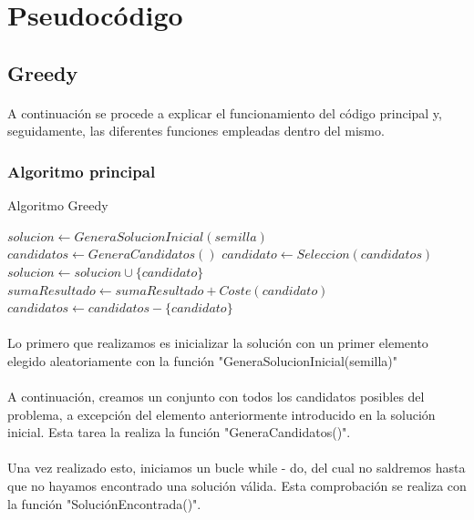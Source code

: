 \documentclass{article}
\begin{document}
	\section{Pseudocódigo}
	
	\subsection{Greedy}
	
		\paragraph{}A continuación se procede a explicar el funcionamiento del código principal y, seguidamente, las diferentes funciones empleadas dentro del mismo.
	
	\subsubsection{Algoritmo principal}
		\begin{algorithm}[H]
			\caption{Algoritmo Greedy}
			\begin{algorithmic}
				\STATE $solucion \leftarrow GeneraSolucionInicial(semilla)$
				\STATE $candidatos \leftarrow GeneraCandidatos()$
				\STATE $candidato \leftarrow Seleccion(candidatos)$
				\STATE $solucion \leftarrow solucion \cup \{candidato\}$
				\STATE $sumaResultado \leftarrow sumaResultado + Coste(candidato)$
				\ENDIF
				\STATE $candidatos \leftarrow candidatos - \{ candidato \}$
				\ENDWHILE
			\end{algorithmic}
		\end{algorithm}
	
		\paragraph{}Lo primero que realizamos es inicializar la solución con un primer elemento elegido aleatoriamente con la función "GeneraSolucionInicial(semilla)"
		
		\paragraph{}A continuación, creamos un conjunto con todos los candidatos posibles del problema, a excepción del elemento anteriormente introducido en la solución inicial. Esta tarea la realiza la función "GeneraCandidatos()".
		
		\paragraph{}Una vez realizado esto, iniciamos un bucle while - do, del cual no saldremos hasta que no hayamos encontrado una solución válida. Esta comprobación se realiza con la función "SoluciónEncontrada()".
		
\end{document}
